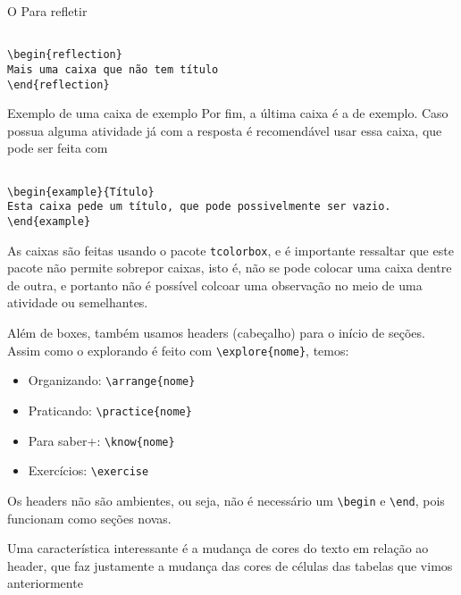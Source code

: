 \begin{reflection}
O Para refletir

\begin{verbatim}

\begin{reflection}
Mais uma caixa que não tem título
\end{reflection}
\end{verbatim}
\end{reflection}

\begin{example}{Exemplo de uma caixa de exemplo}
Por fim, a última caixa é a de exemplo. Caso possua alguma atividade já com a resposta é recomendável usar essa caixa, que pode ser feita com
\begin{verbatim}

\begin{example}{Título}
Esta caixa pede um título, que pode possivelmente ser vazio.
\end{example}
\end{verbatim}
\end{example}

\begin{observation}{}
As caixas são feitas usando o pacote \verb|tcolorbox|, e é importante ressaltar que este pacote não permite sobrepor caixas, isto é, não se pode colocar uma caixa dentre de outra, e portanto não é possível colcoar uma observação no meio de uma atividade ou semelhantes.
\end{observation}


Além de boxes, também usamos headers (cabeçalho) para o início de seções. Assim como o explorando é feito com \verb|\explore{nome}|, temos:

\begin{itemize}
\item Organizando: \verb|\arrange{nome}|
\item Praticando: \verb|\practice{nome}|
\item Para saber+: \verb|\know{nome}|
\item Exercícios: \verb|\exercise|
\end{itemize}

Os headers não são ambientes, ou seja, não é necessário um \verb|\begin| e \verb|\end|, pois funcionam como seções novas. 

Uma característica interessante é a mudança de cores do texto em relação ao header, que faz justamente a mudança das cores de células das tabelas que vimos anteriormente


